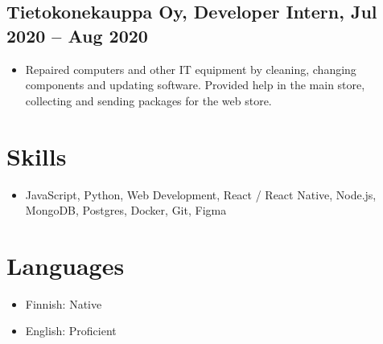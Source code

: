 \documentclass[a4paper,10pt]{article}
\begin{document}
\subsection*{Tietokonekauppa Oy, Developer Intern, Jul 2020 -- Aug 2020}
\begin{itemize}
    \item Repaired computers and other IT equipment by cleaning, changing components and updating software. Provided help in the main store, collecting and sending packages for the web store.
\end{itemize}

\section*{Skills}
\begin{itemize}
    \item JavaScript, Python, Web Development, React / React Native, Node.js, MongoDB, Postgres, Docker, Git, Figma
\end{itemize}

\section*{Languages}
\begin{itemize}
    \item Finnish: Native
    \item English: Proficient
\end{itemize}
\end{document}
